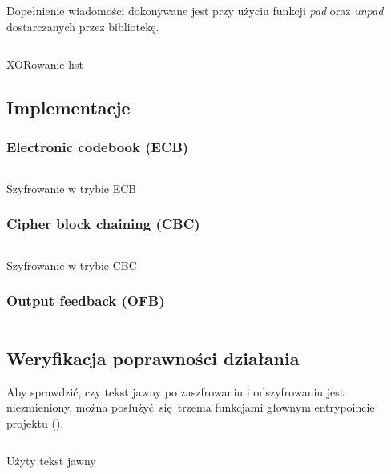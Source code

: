 \documentclass[12pt]{article}
\begin{document}
Dopełnienie wiadomości dokonywane jest przy użyciu funkcji
\textit{pad} oraz \textit{unpad} dostarczanych przez bibliotekę.

\begin{listing}[H]
	\inputminted[firstline=26,lastline=28]{python}{../aes.py}
	\caption{XORowanie list}
\end{listing}

\subsection{Implementacje}

\subsubsection{Electronic codebook (ECB)}

\begin{listing}[H]
	\inputminted[firstline=113,lastline=133]{python}{../aes.py}
	\caption{Szyfrowanie w trybie ECB}
\end{listing}

\subsubsection{Cipher block chaining (CBC)}

\begin{listing}[H]
	\inputminted[firstline=135,lastline=162]{python}{../aes.py}
	\caption{Szyfrowanie w trybie CBC}
\end{listing}

\subsubsection{Output feedback (OFB)}

\begin{listing}[H]
	\inputminted[firstline=164,lastline=185]{python}{../aes.py}
\end{listing}

\subsection{Weryfikacja poprawności działania}

Aby sprawdzić, czy tekst jawny po zaszfrowaniu i odszyfrowaniu jest niezmieniony,
można posłużyć się trzema funkcjami głownym entrypoincie
projektu (\textit{}).

\begin{listing}[H]
	\inputminted[firstline=12,lastline=15]{python}{../aes_tests.py}
	\caption{Użyty tekst jawny}
\end{listing}
\end{document}
